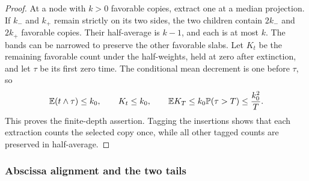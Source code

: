 \begin{proof}
At a node with $k>0$ favorable copies, extract one at a median
projection. If $k_-$ and $k_+$ remain strictly on its two sides,
the two children contain $2k_-$ and $2k_+$ favorable copies.
Their half-average is $k-1$, and each is at most $k$. The bands
can be narrowed to preserve the other favorable slabs. Let $K_t$
be the remaining favorable count under the half-weights, held at
zero after extinction, and let $\tau$ be its first zero time.
The conditional mean decrement is one before $\tau$, so
\[
 \mathbb E(t\wedge\tau)\le k_0,
 \qquad K_t\le k_0,
 \qquad
 \mathbb E K_T\le k_0\mathbb P(\tau>T)\le\frac{k_0^2}{T}.
\]
This proves the finite-depth assertion. Tagging the insertions
shows that each extraction counts the selected copy once, while
all other tagged counts are preserved in half-average.
\end{proof}

\subsubsection{Abscissa alignment and the two tails}

